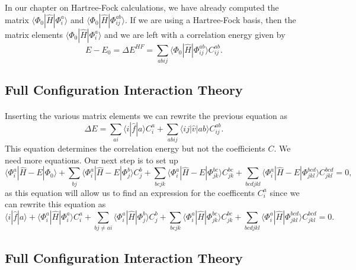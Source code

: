 \documentclass[%
twoside,                 %
final,                   %
10pt]{article}
\begin{document}
In our chapter on Hartree-Fock calculations, 
we have already computed the matrix $\langle \Phi_0 | \hat{H}|\Phi_{i}^{a}\rangle $ and $\langle \Phi_0 | \hat{H}|\Phi_{ij}^{ab}\rangle$.  If we are using a Hartree-Fock basis, then the matrix elements
$\langle \Phi_0 | \hat{H}|\Phi_{i}^{a}\rangle $ and we are left with a correlation energy given by
\[
E-E_0 =\Delta E^{HF}=\sum_{abij}\langle \Phi_0 | \hat{H}|\Phi_{ij}^{ab} \rangle C_{ij}^{ab}. 
\]



\subsection{Full Configuration Interaction Theory}

\paragraph{}
Inserting the various matrix elements we can rewrite the previous equation as
\[
\Delta E=\sum_{ai}\langle i| \hat{f}|a \rangle C_{i}^{a}+
\sum_{abij}\langle ij | \hat{v}| ab \rangle C_{ij}^{ab}.
\]
This equation determines the correlation energy but not the coefficients $C$. 
We need more equations. Our next step is to set up
\[
\langle \Phi_i^a | \hat{H} -E| \Phi_0\rangle + \sum_{bj}\langle \Phi_i^a | \hat{H} -E|\Phi_{j}^{b} \rangle C_{j}^{b}+
\sum_{bcjk}\langle \Phi_i^a | \hat{H} -E|\Phi_{jk}^{bc} \rangle C_{jk}^{bc}+
\sum_{bcdjkl}\langle \Phi_i^a | \hat{H} -E|\Phi_{jkl}^{bcd} \rangle C_{jkl}^{bcd}=0,
\]
as this equation will allow us to find an expression for the coefficents $C_i^a$ since we can rewrite this equation as 
\[
\langle i | \hat{f}| a\rangle +\langle \Phi_i^a | \hat{H}|\Phi_{i}^{a} \rangle C_{i}^{a}+ \sum_{bj\ne ai}\langle \Phi_i^a | \hat{H}|\Phi_{j}^{b} \rangle C_{j}^{b}+
\sum_{bcjk}\langle \Phi_i^a | \hat{H}|\Phi_{jk}^{bc} \rangle C_{jk}^{bc}+
\sum_{bcdjkl}\langle \Phi_i^a | \hat{H}|\Phi_{jkl}^{bcd} \rangle C_{jkl}^{bcd}=0.
\]



\subsection{Full Configuration Interaction Theory}

\end{document}
